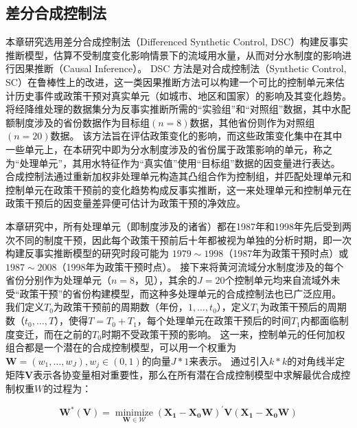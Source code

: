 \subsection{差分合成控制法}\label{sec:DSC}

本章研究选用差分合成控制法（Differenced Synthetic Control, DSC）构建反事实推断模型，估算不受制度变化影响情景下的流域用水量，从而对分水制度的影响进行因果推断（Causal Inference）。
DSC 方法是对合成控制法（Synthetic Control, SC）在鲁棒性上的改进\cite{billmeier2013, smith2015}，这一类因果推断方法可以构建一个可比的控制单元来估计历史事件或政策干预对真实单元（如城市、地区和国家）的影响及其变化趋势\cite{abadie2010, abadie2015, hill2021}。
将经降维处理的数据集分为反事实推断所需的“实验组”和“对照组”数据，其中水配额制度涉及的省份数据作为目标组$(n=8)$数据，其他省份则作为对照组$(n=20)$数据。
该方法旨在评估政策变化的影响，而这些政策变化集中在其中一些单元上，在本研究中即为分水制度涉及的省份属于政策影响的单元，称之为“处理单元”，其用水特征作为“真实值”使用“目标组”数据的因变量进行表达。
合成控制法通过重新加权非处理单元构造其凸组合作为控制组，并匹配处理单元和控制单元在政策干预前的变化趋势构成反事实推断，这一来处理单元和控制单元在政策干预后的因变量差异便可估计为政策干预的净效应。

本章研究中，所有处理单元（即制度涉及的诸省）都在1987年和1998年先后受到两次不同的制度干预，因此每个政策干预前后十年都被视为单独的分析时期，即一次构建反事实推断模型的研究时段可能为 $1979 \sim 1998$（1987年为政策干预时点）或 $1987 \sim 2008$（1998年为政策干预时点）。
接下来将黄河流域分水制度涉及的每个省份分别作为处理单元（$n=8$，见\textbf{}），其余的$J=20$个控制单元均来自流域外未受“政策干预”的省份构建模型，而这种多处理单元的合成控制法也已广泛应用\cite{abadie2021}。
我们定义$T_0$为政策干预前的周期数（年份，$1,\ldots,t_0$），定义$T_1$为政策干预后的周期数（$t_0,\ldots,T$），使得$T = T_0+ T_1$，每个处理单元在政策干预后的时间$T_1$内都面临制度变迁，而在之前的$T_0$时期不受政策干预的影响。
这一来，控制单元的任何加权组合都是一个潜在的合成控制模型，可以用一个权重为$\mathbf{W} = (w_{1},\ldots,w_{J}), w_j \in (0, 1)$的向量$J * 1$来表示。
通过引入$k * k$的对角线半定矩阵$\mathbf{V}$表示各协变量相对重要性，那么在所有潜在合成控制模型中求解最优合成控制权重$W$的过程为：

\begin{equation}
    \mathbf{W^{*}(V)}=\underset{\mathbf{W} \in \mathcal{W}}{\operatorname{minimize}}{\left(\mathbf{X}_{\mathbf{1}}-\mathbf{X}_{\mathbf{0}} \mathbf{W}\right)}^{\prime} {\mathbf{V}}{\left(\mathbf{X}_{\mathbf{1}}-\mathbf{X}_{\mathbf{0}} \mathbf{W}\right)}
\end{equation}

